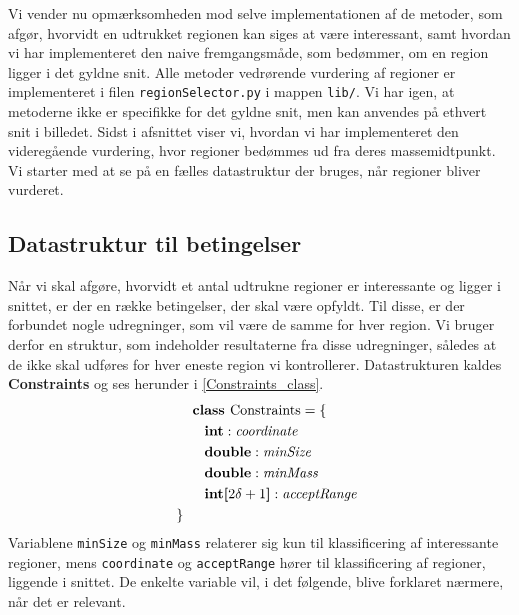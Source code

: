 {
{\sffamily Vi vender nu opmærksomheden mod selve implementationen af de
metoder, som afgør, hvorvidt en udtrukket regionen kan siges at være
interessant, samt hvordan vi har implementeret den naive fremgangsmåde,
som bedømmer, om en region ligger i det gyldne snit. Alle metoder
vedrørende vurdering af regioner er implementeret i filen
\texttt{regionSelector.py} i mappen \texttt{lib/}.  Vi har igen, at
metoderne ikke er specifikke for det gyldne snit, men kan anvendes på
ethvert snit i billedet. Sidst i afsnittet viser vi, hvordan vi har
implementeret den videregående vurdering, hvor regioner bedømmes ud fra
deres massemidtpunkt. Vi starter med at se på en fælles datastruktur der
bruges, når regioner bliver vurderet.
}

\subsection{Datastruktur til betingelser}
Når vi skal afgøre, hvorvidt et antal udtrukne regioner er interessante
og ligger i snittet, er der en række betingelser, der skal være opfyldt.
Til disse, er der forbundet nogle udregninger, som vil være de samme for
hver region. Vi bruger derfor en struktur, som indeholder resultaterne
fra disse udregninger, således at de ikke skal udføres for hver eneste
region vi kontrollerer. Datastrukturen kaldes \textbf{Constraints} og
ses herunder i \eqref{Constraints_class}.
\begin{multline}
    \textbf{class~} \textrm{Constraints} = \{ \\
    \shoveleft{\qquad\textbf{int} : \textit{coordinate}} \\
    \shoveleft{\qquad\textbf{double} : \textit{minSize}} \\
    \shoveleft{\qquad\textbf{double} : \textit{minMass}} \\
    \shoveleft{\qquad\textbf{int[}2\delta + 1\textbf{]} : \textit{acceptRange}} \\
    \shoveleft{\}}\shoveright{}
    \label{Constraints_class}
\end{multline}
Variablene \texttt{minSize} og \texttt{minMass} relaterer sig kun til
klassificering af interessante regioner, mens \texttt{coordinate} og
\texttt{acceptRange} hører til klassificering af regioner, liggende i
snittet. De enkelte variable vil, i det følgende, blive forklaret
nærmere, når det er relevant.

}
